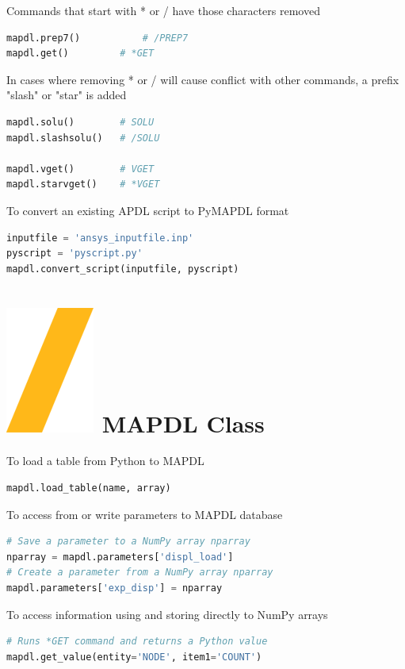 \documentclass[9pt,landscape]{article}
\begin{document}
\begin{multicols}{3}
Commands that start with * or / have those characters removed
\begin{lstlisting}[language=Python]
mapdl.prep7()	        # /PREP7
mapdl.get()	        # *GET
\end{lstlisting}

In cases where removing * or / will cause conflict with other commands, a prefix "slash" or "star" is added
\begin{lstlisting}[language=Python]
mapdl.solu()		# SOLU
mapdl.slashsolu()	# /SOLU

mapdl.vget()		# VGET
mapdl.starvget()	# *VGET
\end{lstlisting} 

\columnbreak
To convert an existing APDL script to PyMAPDL format
\begin{lstlisting}[language=Python]
inputfile = 'ansys_inputfile.inp'
pyscript = 'pyscript.py'
mapdl.convert_script(inputfile, pyscript)
\end{lstlisting} 

\section{\includegraphics[height=\fontcharht\font`\S]{slash.png} MAPDL Class}
To load a table from Python to MAPDL
\begin{lstlisting}[language=Python]
mapdl.load_table(name, array)
\end{lstlisting} 

To access from or write parameters to MAPDL database
\begin{lstlisting}[language=Python]
# Save a parameter to a NumPy array nparray
nparray = mapdl.parameters['displ_load']
# Create a parameter from a NumPy array nparray
mapdl.parameters['exp_disp'] = nparray
\end{lstlisting} 

To access information using  and  storing directly to NumPy arrays
\begin{lstlisting}[language=Python]
# Runs *GET command and returns a Python value
mapdl.get_value(entity='NODE', item1='COUNT')


\end{lstlisting}
\end{multicols}
\end{document}
